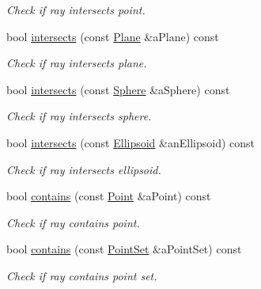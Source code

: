 \begin{DoxyCompactItemize}
\begin{DoxyCompactList}\small\item\em Check if ray intersects point. \end{DoxyCompactList}\item 
bool \hyperlink{classostk_1_1math_1_1geom_1_1d3_1_1objects_1_1_ray_a8eb58fe0f0aaa491008112f411b49c33}{intersects} (const \hyperlink{classostk_1_1math_1_1geom_1_1d3_1_1objects_1_1_plane}{Plane} \&a\+Plane) const
\begin{DoxyCompactList}\small\item\em Check if ray intersects plane. \end{DoxyCompactList}\item 
bool \hyperlink{classostk_1_1math_1_1geom_1_1d3_1_1objects_1_1_ray_a0b01dbc44a2f8afdbef8495ab09d7457}{intersects} (const \hyperlink{classostk_1_1math_1_1geom_1_1d3_1_1objects_1_1_sphere}{Sphere} \&a\+Sphere) const
\begin{DoxyCompactList}\small\item\em Check if ray intersects sphere. \end{DoxyCompactList}\item 
bool \hyperlink{classostk_1_1math_1_1geom_1_1d3_1_1objects_1_1_ray_a48652010593cea440e028d9c02195108}{intersects} (const \hyperlink{classostk_1_1math_1_1geom_1_1d3_1_1objects_1_1_ellipsoid}{Ellipsoid} \&an\+Ellipsoid) const
\begin{DoxyCompactList}\small\item\em Check if ray intersects ellipsoid. \end{DoxyCompactList}\item 
bool \hyperlink{classostk_1_1math_1_1geom_1_1d3_1_1objects_1_1_ray_a7a8791f8658c741fd8ce967511ed2f5f}{contains} (const \hyperlink{classostk_1_1math_1_1geom_1_1d3_1_1objects_1_1_point}{Point} \&a\+Point) const
\begin{DoxyCompactList}\small\item\em Check if ray contains point. \end{DoxyCompactList}\item 
bool \hyperlink{classostk_1_1math_1_1geom_1_1d3_1_1objects_1_1_ray_a4433e066d6de57630140527bc74442ec}{contains} (const \hyperlink{classostk_1_1math_1_1geom_1_1d3_1_1objects_1_1_point_set}{Point\+Set} \&a\+Point\+Set) const
\begin{DoxyCompactList}\small\item\em Check if ray contains point set. \end{DoxyCompactList}\item 

\end{DoxyCompactItemize}
